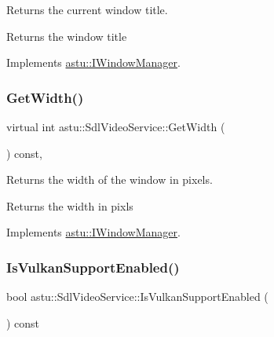 Returns the current window title.

\begin{DoxyReturn}{Returns}
the window title 
\end{DoxyReturn}


Implements \hyperlink{classastu_1_1IWindowManager_aa5733f1ceda60796f6e35f5f7b79ffa9}{astu\+::\+I\+Window\+Manager}.

\mbox{\label{classastu_1_1SdlVideoService_a45c3181611e718bcfe44862baed6d520}} 
\subsubsection{\texorpdfstring{Get\+Width()}{GetWidth()}}
{\footnotesize\ttfamily virtual int astu\+::\+Sdl\+Video\+Service\+::\+Get\+Width (\begin{DoxyParamCaption}{ }\end{DoxyParamCaption}) const\hspace{0.3cm}{\ttfamily [override]}, {\ttfamily [virtual]}}

Returns the width of the window in pixels.

\begin{DoxyReturn}{Returns}
the width in pixls 
\end{DoxyReturn}


Implements \hyperlink{classastu_1_1IWindowManager_a6f818a88754bde33c3121e7413d3a554}{astu\+::\+I\+Window\+Manager}.

\mbox{\label{classastu_1_1SdlVideoService_aa40bb996597ad6c1005ce9dfd632cf28}} 
\subsubsection{\texorpdfstring{Is\+Vulkan\+Support\+Enabled()}{IsVulkanSupportEnabled()}}
{\footnotesize\ttfamily bool astu\+::\+Sdl\+Video\+Service\+::\+Is\+Vulkan\+Support\+Enabled (\begin{DoxyParamCaption}{ }\end{DoxyParamCaption}) const}


